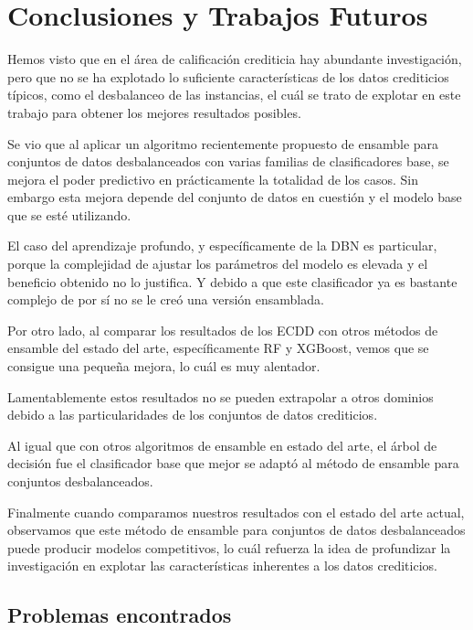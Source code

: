 \chapter{Conclusiones y Trabajos Futuros}\label{chap:conclusiones}


Hemos visto que en el área de calificación crediticia hay abundante investigación, pero que no se ha explotado lo suficiente características de los datos crediticios típicos, como el desbalanceo de las instancias, el cuál se trato de explotar en este trabajo para obtener los mejores resultados posibles.

Se vio que al aplicar un algoritmo recientemente propuesto de ensamble para conjuntos de datos desbalanceados con varias familias de clasificadores base, se mejora el poder predictivo en prácticamente la totalidad de los casos. Sin embargo esta mejora depende del conjunto de datos en cuestión y el modelo base que se esté utilizando.

El caso del aprendizaje profundo, y específicamente de la \ac{DBN} es particular, porque la complejidad de ajustar los parámetros del modelo es elevada y el beneficio obtenido no lo justifica. Y debido a que este clasificador ya es bastante complejo de por sí no se le creó una versión ensamblada.

Por otro lado, al comparar los resultados de los \ac{ECDD} con otros métodos de ensamble del estado del arte, específicamente \ac{RF} y \ac{XGBoost}, vemos que se consigue una pequeña mejora, lo cuál es muy alentador.

Lamentablemente estos resultados no se pueden extrapolar a otros dominios debido a las particularidades de los conjuntos de datos crediticios.

Al igual que con otros algoritmos de ensamble en estado del arte, el árbol de decisión fue el clasificador base que mejor se adaptó al método de ensamble para conjuntos desbalanceados.

Finalmente cuando comparamos nuestros resultados con el estado del arte actual, observamos que este método de ensamble para conjuntos de datos desbalanceados puede producir modelos competitivos, lo cuál refuerza la idea de profundizar la investigación en explotar las características inherentes a los datos crediticios.

\section{Problemas encontrados}

